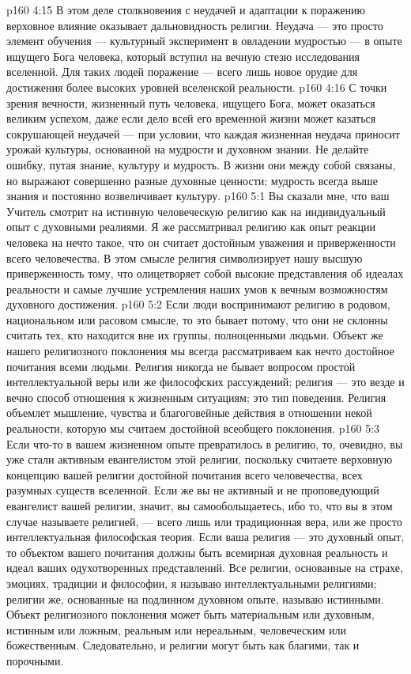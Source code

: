 \vs p160 4:15 В этом деле столкновения с неудачей и адаптации к поражению верховное влияние оказывает дальновидность религии. Неудача --- это просто элемент обучения --- культурный эксперимент в овладении мудростью --- в опыте ищущего Бога человека, который вступил на вечную стезю исследования вселенной. Для таких людей поражение --- всего лишь новое орудие для достижения более высоких уровней вселенской реальности.
\vs p160 4:16 С точки зрения вечности, жизненный путь человека, ищущего Бога, может оказаться великим успехом, даже если дело всей его временной жизни может казаться сокрушающей неудачей --- при условии, что каждая жизненная неудача приносит урожай культуры, основанной на мудрости и духовном знании. Не делайте ошибку, путая знание, культуру и мудрость. В жизни они между собой связаны, но выражают совершенно разные духовные ценности; мудрость всегда выше знания и постоянно возвеличивает культуру.
\vs p160 5:1 Вы сказали мне, что ваш Учитель смотрит на истинную человеческую религию как на индивидуальный опыт с духовными реалиями. Я же рассматривал религию как опыт реакции человека на нечто такое, что он считает достойным уважения и приверженности всего человечества. В этом смысле религия символизирует нашу высшую приверженность тому, что олицетворяет собой высокие представления об идеалах реальности и самые лучшие устремления наших умов к вечным возможностям духовного достижения.
\vs p160 5:2 Если люди воспринимают религию в родовом, национальном или расовом смысле, то это бывает потому, что они не склонны считать тех, кто находится вне их группы, полноценными людьми. Объект же нашего религиозного поклонения мы всегда рассматриваем как нечто достойное почитания всеми людьми. Религия никогда не бывает вопросом простой интеллектуальной веры или же философских рассуждений; религия --- это везде и вечно способ отношения к жизненным ситуациям; это тип поведения. Религия объемлет мышление, чувства и благоговейные действия в отношении некой реальности, которую мы считаем достойной всеобщего поклонения.
\vs p160 5:3 Если что\hyp{}то в вашем жизненном опыте превратилось в религию, то, очевидно, вы уже стали активным евангелистом этой религии, поскольку считаете верховную концепцию вашей религии достойной почитания всего человечества, всех разумных существ вселенной. Если же вы не активный и не проповедующий евангелист вашей религии, значит, вы самообольщаетесь, ибо то, что вы в этом случае называете религией, --- всего лишь или традиционная вера, или же просто интеллектуальная философская теория. Если ваша религия --- это духовный опыт, то объектом вашего почитания должны быть всемирная духовная реальность и идеал ваших одухотворенных представлений. Все религии, основанные на страхе, эмоциях, традиции и философии, я называю интеллектуальными религиями; религии же, основанные на подлинном духовном опыте, называю истинными. Объект религиозного поклонения может быть материальным или духовным, истинным или ложным, реальным или нереальным, человеческим или божественным. Следовательно, и религии могут быть как благими, так и порочными.
